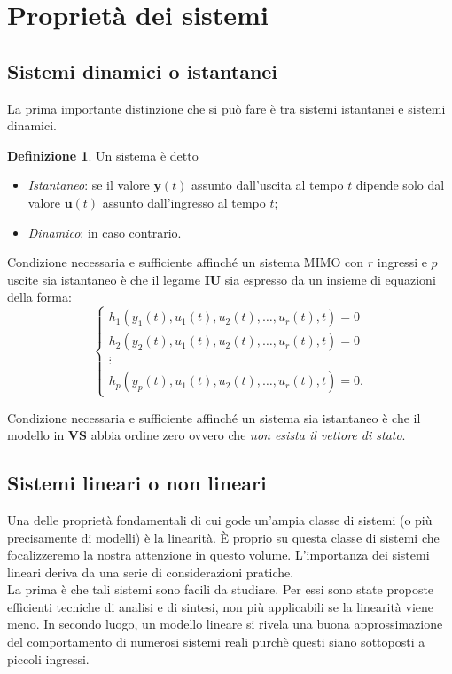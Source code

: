 \documentclass[a4paper]{article}
\renewcommand{\vec}{\bm}
\theoremstyle{definition}
\newtheorem{defn}{Definizione}[section]
\begin{document}
	\section{Proprietà dei sistemi}
		\subsection{Sistemi dinamici o istantanei}
			La prima importante distinzione che si può fare è tra sistemi istantanei e sistemi
			dinamici.
			
			\begin{defn}
				Un sistema è detto
				\begin{itemize}
					\item \textit{Istantaneo}: se il valore $ \vec{y}(t) $ assunto dall'uscita al tempo $ t $ dipende solo dal valore $ \vec{u}(t) $ assunto dall'ingresso al tempo $ t $;
					\item \textit{Dinamico}: in caso contrario.
				\end{itemize}
			\end{defn}
			
			Condizione necessaria e sufficiente affinché un sistema MIMO con $ r $ ingressi e $ p $ uscite sia istantaneo è che il legame \textbf{IU} sia espresso da un insieme di equazioni della forma:
			\[
				\begin{cases}
					h_1 (y_1(t),u_1(t),u_2(t),\dots, u_r(t),t) = 0 \\
					h_2 (y_2(t),u_1(t),u_2(t),\dots, u_r(t),t) = 0 \\
					\vdots \\
					h_p (y_p(t),u_1(t),u_2(t),\dots, u_r(t),t) = 0.
				\end{cases}
			\]
			
			Condizione necessaria e sufficiente affinché un sistema sia istantaneo è che il modello in \textbf{VS} abbia ordine zero ovvero che \textit{non esista il vettore di stato}.
			
		\subsection{Sistemi lineari o non lineari}
			Una delle proprietà fondamentali di cui gode un'ampia classe di sistemi (o più precisamente di modelli) è la linearità. È proprio su questa classe di sistemi che focalizzeremo la nostra attenzione in questo volume. L'importanza dei sistemi lineari deriva
			da una serie di considerazioni pratiche.\\
			La prima è che tali sistemi sono facili da studiare. Per essi sono state proposte
			efficienti tecniche di analisi e di sintesi, non più applicabili se la linearità viene meno.
			In secondo luogo, un modello lineare si rivela una buona approssimazione del
			comportamento di numerosi sistemi reali purchè questi siano sottoposti a piccoli
			ingressi.
			
\end{document}
